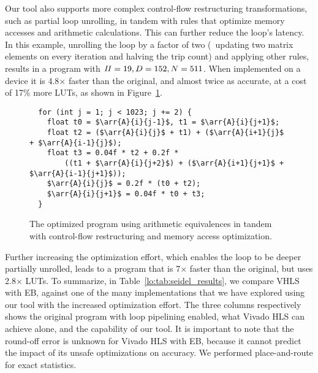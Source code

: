 Our tool also supports more complex control-flow restructuring transformations,
such as partial loop unrolling, in tandem with rules that optimize memory
accesses and arithmetic calculations.  This can further reduce the loop's
latency.  In this example, unrolling the loop by a factor of two (\ie~updating
two matrix elements on every iteration and halving the trip count) and
applying other rules, results in a program with $\mathit{II} = 19, D = 152, N = 511$.
When implemented on a device it is 4.8$\times$ faster than the original,
and almost twice as accurate, at a cost of 17\% more LUTs, as shown in
Figure~\ref{lo:fig:seidel_prog_3}.

\begin{figure}[ht]
\begin{lstlisting}
  for (int j = 1; j < 1023; j += 2) {
    float t0 = $\arr{A}{i}{j-1}$, t1 = $\arr{A}{i}{j+1}$;
    float t2 = ($\arr{A}{i}{j}$ + t1) + ($\arr{A}{i+1}{j}$ + $\arr{A}{i-1}{j}$);
    float t3 = 0.04f * t2 + 0.2f *
        ((t1 + $\arr{A}{i}{j+2}$) + ($\arr{A}{i+1}{j+1}$ + $\arr{A}{i-1}{j+1}$));
    $\arr{A}{i}{j}$ = 0.2f * (t0 + t2);
    $\arr{A}{i}{j+1}$ = 0.04f * t0 + t3;
  }
\end{lstlisting}
    \caption{The optimized program using arithmetic equivalences in tandem with
    control-flow restructuring and memory access optimization.}
    \label{lo:fig:seidel_prog_3}
\end{figure}

Further increasing the optimization effort, which enables the loop to
be deeper partially unrolled, leads to a program that is 7$\times$
faster than the original, but uses 2.8$\times$ LUTs.  To summarize, in
Table~\ref{lo:tab:seidel_results}, we compare VHLS with EB, against one of the
many implementations that we have explored using our tool with the increased
optimization effort.  The three columns respectively shows the original
program with loop pipelining enabled, what Vivado HLS can achieve alone, and
the capability of our tool.  It is important to note that the round-off error
is unknown for Vivado HLS with EB, because it cannot predict the impact of
its unsafe optimizations on accuracy.  We performed place-and-route for exact
statistics.

